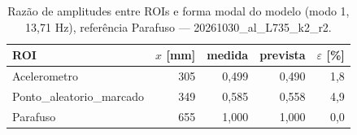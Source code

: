 \begin{table}[htbp]
  \centering
  \caption{Razão de amplitudes entre ROIs e forma modal do modelo (modo 1, 13{,}71 Hz), referência Parafuso — 20261030\_al\_L735\_k2\_r2.}
  \label{tab:forma_modal_20261030_al_L735_k2_r2}
  \begin{tabular}{lrrrr}
    \toprule
    ROI & $x$ [mm] & medida & prevista & $\varepsilon$ [\%] \\
    \midrule
    Acelerometro & 305 & 0{,}499 & 0{,}490 & 1{,}8 \\
    Ponto\_aleatorio\_marcado & 349 & 0{,}585 & 0{,}558 & 4{,}9 \\
    Parafuso & 655 & 1{,}000 & 1{,}000 & 0{,}0 \\
    \bottomrule
  \end{tabular}
\end{table}
